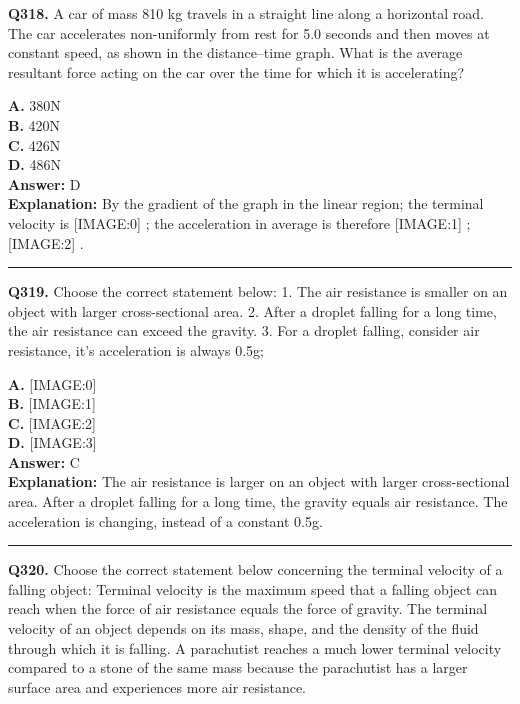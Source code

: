 \documentclass[12pt]{article}
\begin{document}
\noindent
\textbf{Q318.} A car of mass 810 kg travels in a straight line along a horizontal road.
The car accelerates non-uniformly from rest for 5.0 seconds and then moves at constant speed, as shown in the distance–time graph.
What is the average resultant force acting on the car over the time for which it is accelerating?



\textbf{A.} 380N \\
\textbf{B.} 420N \\
\textbf{C.} 426N \\
\textbf{D.} 486N \\

\textbf{Answer:} D \\
\textbf{Explanation:} By the gradient of the graph in the linear region; the terminal velocity is
[IMAGE:0]
; the acceleration in average is therefore
[IMAGE:1]
;
[IMAGE:2]
.

\hrule
\vspace{1em}


\noindent
\textbf{Q319.} Choose the correct statement below:
1. The air resistance is smaller on an object with larger cross-sectional area.
2. After a droplet falling for a long time, the air resistance can exceed the gravity.
3. For a droplet falling, consider air resistance, it’s acceleration is always 0.5g;



\textbf{A.} [IMAGE:0] \\
\textbf{B.} [IMAGE:1] \\
\textbf{C.} [IMAGE:2] \\
\textbf{D.} [IMAGE:3] \\

\textbf{Answer:} C \\
\textbf{Explanation:} The air resistance is larger on an object with larger cross-sectional area.
After a droplet falling for a long time, the gravity equals air resistance.
The acceleration is changing, instead of a constant 0.5g.

\hrule
\vspace{1em}


\noindent
\textbf{Q320.} Choose the correct statement below concerning the terminal velocity of a falling object:
Terminal velocity is the maximum speed that a falling object can reach when the force of air resistance equals the force of gravity.
The terminal velocity of an object depends on its mass, shape, and the density of the fluid through which it is falling.
A parachutist reaches a much lower terminal velocity compared to a stone of the same mass because the parachutist has a larger surface area and experiences more air resistance.
\end{document}

